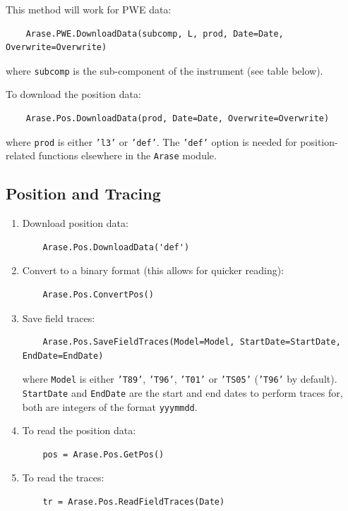	This method will work for PWE data:
	
	\begin{verbatim}
	Arase.PWE.DownloadData(subcomp, L, prod, Date=Date, Overwrite=Overwrite)
	\end{verbatim}
	
	where \texttt{subcomp} is the sub-component of the instrument (see table below).
	
	To download the position data:
	
	\begin{verbatim}
	Arase.Pos.DownloadData(prod, Date=Date, Overwrite=Overwrite)
	\end{verbatim}
	
	where \texttt{prod} is either \texttt{'l3'} or \texttt{'def'}. The \texttt{'def'} option is needed for position-related functions elsewhere in the \texttt{Arase} module.
	
	\subsection{Position and Tracing}
	
	\begin{enumerate}
	\item Download position data:
	\begin{verbatim}
	Arase.Pos.DownloadData('def')
	\end{verbatim}
	\item Convert to a binary format (this allows for quicker reading):
	\begin{verbatim}
	Arase.Pos.ConvertPos()
	\end{verbatim}
	\item Save field traces:
	\begin{verbatim}
	Arase.Pos.SaveFieldTraces(Model=Model, StartDate=StartDate, EndDate=EndDate)
	\end{verbatim}
	where \texttt{Model} is either \texttt{'T89'}, \texttt{'T96'}, \texttt{'T01'} or \texttt{'TS05'} (\texttt{'T96'} by default). \texttt{StartDate} and \texttt{EndDate} are the start and end dates to perform traces for, both are integers of the format \texttt{yyymmdd}.
	\item To read the position data:
	\begin{verbatim}
	pos = Arase.Pos.GetPos()
	\end{verbatim}
	\item To read the traces:
	\begin{verbatim}
	tr = Arase.Pos.ReadFieldTraces(Date)
	\end{verbatim}
	\end{enumerate}
	
